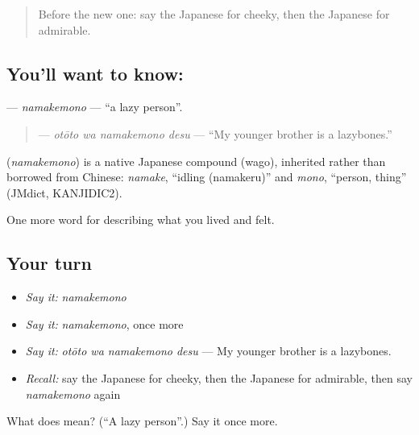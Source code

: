 \label{lesson:JA-C441-namakemono}



\begin{quote}
Before the new one: say the Japanese for cheeky, then the Japanese for admirable.
\end{quote}

\subsection*{You'll want to know: }
\textbf{} — \emph{namakemono} — \textquotedblleft{}a lazy person\textquotedblright{}.

\begin{quote}
\textbf{ } — \emph{otōto wa namakemono desu} — \textquotedblleft{}My younger brother is a lazybones.\textquotedblright{}
\end{quote}

\begin{cousinweb}
\textbf{} (\emph{namakemono}) is a native Japanese compound (wago), inherited rather than borrowed from Chinese: \emph{namake}, \textquotedblleft{}idling (namakeru)\textquotedblright{} and \emph{mono}, \textquotedblleft{}person, thing\textquotedblright{} (JMdict, KANJIDIC2).
\end{cousinweb}

\begin{grammarlens}[title={What you've built}]
One more word for describing what you lived and felt.
\end{grammarlens}

\subsection*{Your turn}
\begin{itemize}
\raggedright
  \item \emph{Say it:} \emph{namakemono}
  \item \emph{Say it:} \emph{namakemono}, once more
  \item \emph{Say it:} \emph{otōto wa namakemono desu} — My younger brother is a lazybones.
  \item \emph{Recall:} say the Japanese for cheeky, then the Japanese for admirable, then say \emph{namakemono} again
\end{itemize}

\begin{tcolorbox}[breakable,colback=teal!4,colframe=teal!35!black,title={Before you move on}]
What does  mean? (\textquotedblleft{}A lazy person\textquotedblright{}.) Say it once more.
\end{tcolorbox}

